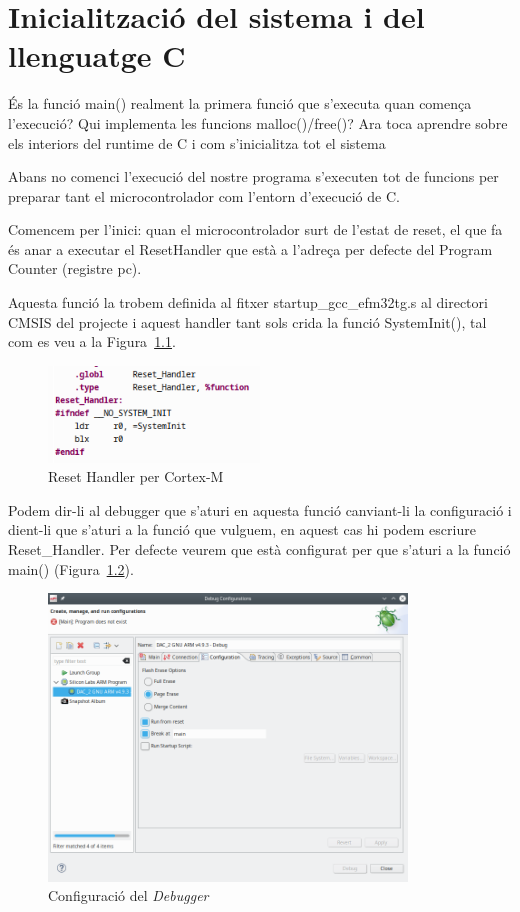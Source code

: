\chapter{Inicialització del sistema i del llenguatge C}
\label{ch:initialization}
És la funció main() realment la primera funció que s’executa quan comença l’execució? 
Qui implementa les funcions malloc()/free()? 
Ara toca aprendre sobre els interiors del runtime de C i com s’inicialitza tot el sistema

Abans no comenci l’execució del nostre programa s’executen tot de funcions 
per preparar tant el microcontrolador com l’entorn d’execució de C.

Comencem per l’inici: quan el microcontrolador surt de l’estat de reset, 
el que fa és anar a executar el ResetHandler que està a l’adreça per defecte 
del Program Counter (registre pc).

Aquesta funció la trobem definida al fitxer startup\_gcc\_efm32tg.s al directori
CMSIS del projecte i aquest handler tant sols crida la funció SystemInit(), tal 
com es veu a la Figura~\ref{fig:resethandlercortex}.

\begin{figure}
 \centering
 \includegraphics[width=0.50\textwidth, keepaspectratio]{imatges/resethandlercortex.png}
 \caption{Reset Handler per Cortex-M}
 \label{fig:resethandlercortex}
\end{figure}


Podem dir-li al debugger que s’aturi en aquesta funció canviant-li la 
configuració i dient-li que s’aturi a la funció que vulguem, en aquest cas hi 
podem escriure Reset\_Handler. Per defecte veurem que està configurat per 
que s’aturi a la funció main() (Figura~\ref{fig:debugstopat}).

\begin{figure}
 \centering
 \includegraphics[width=0.85\textwidth, keepaspectratio]{imatges/debugstopat.png}
 \caption{Configuració del {\it Debugger}}
 \label{fig:debugstopat}
\end{figure}


